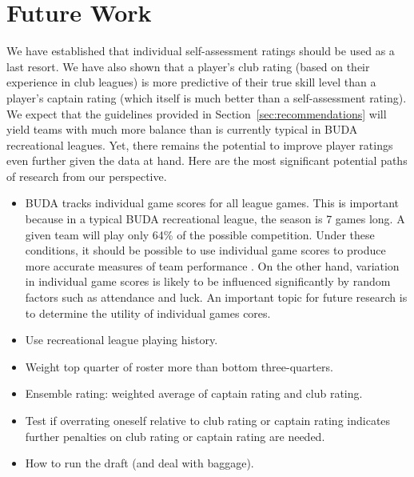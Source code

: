 \section{Future Work}\label{sec:summary}

We have established that individual self-assessment ratings should be used as a last resort. We have also shown that a player's club rating (based on their experience in club leagues) is more predictive of their true skill level than a player's captain rating (which itself is much better than a self-assessment rating). We expect that the guidelines provided in Section~\ref{sec:recommendations} will yield teams with much more balance than is currently typical in BUDA recreational leagues. Yet, there remains the potential to improve player ratings even further given the data at hand. Here are the most significant potential paths of research from our perspective.

\begin{itemize}

\item BUDA tracks individual game scores for all league games. This is important because in a typical BUDA recreational league, the season is 7 games long. A given team will play only 64\% of the possible competition. Under these conditions, it should be possible to use individual game scores to produce more accurate measures of team performance \cite{Langville_2012}. On the other hand, variation in individual game scores is likely to be influenced significantly by random factors such as attendance and luck. An important topic for future research is to determine the utility of individual games cores.

\item Use recreational league playing history.

\item Weight top quarter of roster more than bottom three-quarters.

\item Ensemble rating: weighted average of captain rating and club rating.

\item Test if overrating oneself relative to club rating or captain rating indicates further penalties on club rating or captain rating are needed.

\item How to run the draft (and deal with baggage).

\end{itemize}